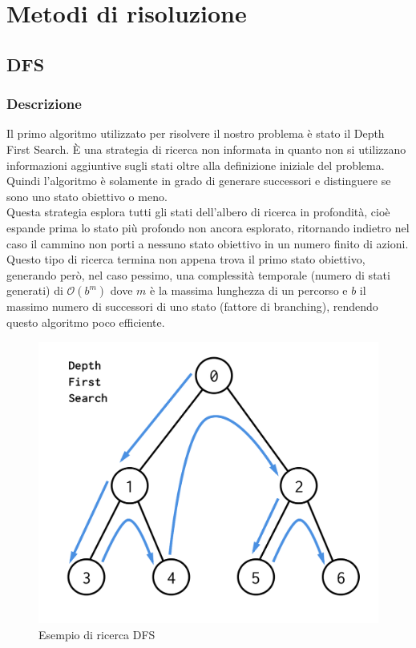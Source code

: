 
\chapter{Metodi di risoluzione}
\label{cap:algoritmi}

\section{DFS}
\subsection{Descrizione}
Il primo algoritmo utilizzato per risolvere il nostro problema è stato il Depth First Search. È una strategia di ricerca non informata in quanto non si utilizzano informazioni aggiuntive sugli stati oltre alla definizione iniziale del problema.
Quindi l'algoritmo è solamente in grado di generare successori e distinguere se sono uno stato obiettivo o meno. \\
Questa strategia esplora tutti gli stati dell'albero di ricerca in profondità, cioè espande prima lo stato più profondo non ancora esplorato, ritornando indietro nel caso il cammino non porti a nessuno stato obiettivo in un numero finito di azioni. \\
Questo tipo di ricerca termina non appena trova il primo stato obiettivo, generando però, nel caso pessimo, una complessità temporale (numero di stati generati) di $\mathcal{O}(b^m)$ dove $m$ è la massima lunghezza di un percorso e $b$ il massimo numero di successori di uno stato (fattore di branching), rendendo questo algoritmo poco efficiente.
\begin{figure}[h]
	\centering
	\includegraphics[scale=0.25]{immagini/dfs}
	\caption{Esempio di ricerca DFS}
	\label{fig:dfs}
\end{figure}

